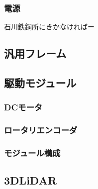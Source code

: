 \subsubsection{電源}
石川鉄鋼所にきかなければー
\subsection{汎用フレーム} \label{frame}







\subsection{駆動モジュール} \label{module}
\subsubsection{DCモータ}
\subsubsection{ロータリエンコーダ}
\subsubsection{モジュール構成}



\subsection{3DLiDAR} \label{LiDAR}

